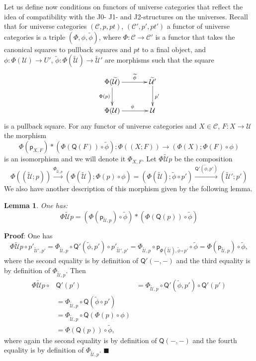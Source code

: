\documentclass[12pt]{article}
\numberwithin{equation}{section}
\newenvironment{eq}{\begin{equation}}{\end{equation}}
\newenvironment{myproof}{{\bf Proof}:}{$\blacksquare$ \vskip 5mm }
\newtheorem{lemma}[proposition]{Lemma}
\newcommand{\llabel}[1]{\label{#1}}
\newcommand{\sr}{\rightarrow}
\newcommand{\lr}{\longrightarrow}
\newcommand{\wt}{\widetilde}
\newcommand{\C}{{\mathcal C}}  %
\newcommand{\p}{\mathsf{p}}
\newcommand{\U}{\mathcal{U}}
\newcommand{\Q}{\mathsf{Q}}
\begin{document}
Let us define now conditions on functors of universe categories that reflect
the idea of compatibility with the J0- J1- and J2-structures on the
universes. Recall that for universe categories $({\C},p,pt)$,
$({\C}',p',pt')$ a functor of universe categories is a triple
$(\Phi,\phi,\wt{\phi})$, where $\Phi:{\C}\sr {\C}'$ is a functor
that takes the canonical squares to pullback squares and $pt$ to a final object,
and $\phi:\Phi(\U)\sr U'$, $\wt{\phi}:\Phi(\wt{\U})\sr \wt{\U}'$ are morphisms
such that the square
%
\begin{eq}\llabel{2015.04.06.eq10}
\begin{xy}
          \xymatrix@C=3pc{ \Phi(\wt{\U}) \ar[r]^-{\wt{\phi}} \ar[d]_{\Phi(p)} &
            \wt{\U}' \ar[d]^{p'}\\ \Phi(\U) \ar[r]^{\phi} & \U }
\end{xy}
\end{eq}%
%
is a pullback square. For any functor of universe categories and $X\in{\mathcal
  C}$, $F:X\sr \U$ the morphism
%
$$\Phi(\p_{X,F})*(\Phi(\Q(F))\circ\wt{\phi}):\Phi((X;F))\sr
(\Phi(X);\Phi(F)\circ\phi)$$
%
is an isomorphism and we will denote it $\Phi_{X,F}$. Let $\Phi\wt{\U}p$ be the
composition
%
$$\Phi((\wt{\U};p)) \stackrel{\Phi_{\wt{\U},p}}{\lr} (\Phi(\wt{\U});\Phi(p)\circ
\phi)=(\Phi(\wt{\U});\wt{\phi}\circ p')\stackrel{\Q'(\wt{\phi},p')}{\lr}
(\wt{\U}';p')$$
%
We also have another description of this morphism given by the following lemma.
%
\begin{lemma}
\llabel{2015.04.10.l5} One has:
%
$$\Phi\wt{\U}p=(\Phi(\p_{\wt{\U},p})\circ\wt{\phi})*(\Phi(\Q(p))\circ\wt{\phi})$$
%
\end{lemma}
%
\begin{myproof}
One has
%
$$\Phi\wt{\U}p\circ p'_{\wt{\U}',p'}=\Phi_{\wt{\U},p}\circ \Q'(\wt{\phi},p')\circ
p'_{\wt{\U}',p'} =\Phi_{\wt{\U},p}\circ \p_{\Phi(\wt{\U}),\wt{\phi}\circ
  p'}\circ\wt{\phi}=\Phi(\p_{\wt{\U},p})\circ \wt{\phi},$$
%
where the second equality is by definition of $\Q'(-,-)$ and the third equality
is by definition of $\Phi_{\wt{\U},p}$. Then
%
\begin{align*}
  \Phi\wt{\U}p\circ & \Q'(p')
    & = \Phi_{\wt{\U},p}\circ \Q'(\wt{\phi},p')\circ \Q'(p') \\
    & = \Phi_{\wt{\U},p}\circ \Q(\wt{\phi}\circ p') \\
    & = \Phi_{\wt{\U},p}\circ \Q(\Phi(p)\circ \phi) \\
    & = \Phi(\Q(p))\circ \wt{\phi},
\end{align*}
%
where again the second equality is by definition of $\Q(-,-)$ and the fourth
equality is by definition of $\Phi_{\wt{\U},p}$.
\end{myproof}
\end{document}
